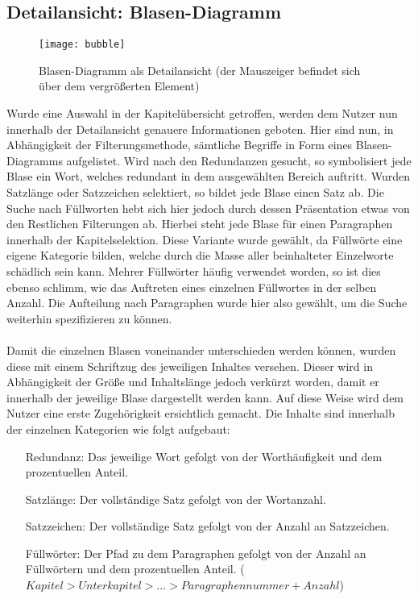 \subsection{Detailansicht: Blasen-Diagramm}\label{subsec:bubble}
\begin{figure}[!htbp]
 \centering
 \texttt{[image: bubble]}
 \caption{Blasen-Diagramm als Detailansicht (der Mauszeiger befindet sich \"uber dem vergr\"o{\ss}erten Element)}
 \label{fig:bubble}
\end{figure}
Wurde eine Auswahl in der Kapitel\"ubersicht getroffen, werden dem Nutzer nun innerhalb der Detailansicht genauere Informationen geboten. Hier sind nun, in Abh\"angigkeit der Filterungsmethode, s\"amtliche Begriffe in Form eines Blasen-Diagramms aufgelistet. Wird nach den Redundanzen gesucht, so symbolisiert jede Blase ein Wort, welches redundant in dem ausgew\"ahlten Bereich auftritt. Wurden Satzl\"ange oder Satzzeichen selektiert, so bildet jede Blase einen Satz ab. Die Suche nach F\"ullworten hebt sich hier jedoch durch dessen Pr\"asentation etwas von den Restlichen Filterungen ab. Hierbei steht jede Blase f\"ur einen Paragraphen innerhalb der Kapitelselektion. Diese Variante wurde gew\"ahlt, da F\"ullw\"orte eine eigene Kategorie bilden, welche durch die Masse aller beinhalteter Einzelworte sch\"adlich sein kann. Mehrer F\"ullw\"orter h\"aufig verwendet worden, so ist dies ebenso schlimm, wie das Auftreten eines einzelnen F\"ullwortes in der selben Anzahl. Die Aufteilung nach Paragraphen wurde hier also gew\"ahlt, um die Suche weiterhin spezifizieren zu k\"onnen.\\
\\
Damit die einzelnen Blasen voneinander unterschieden werden k\"onnen, wurden diese mit einem Schriftzug des jeweiligen Inhaltes versehen. Dieser wird in Abh\"angigkeit der Gr\"o{\ss}e und Inhaltsl\"ange jedoch verk\"urzt worden, damit er innerhalb der jeweilige Blase dargestellt werden kann. Auf diese Weise wird dem Nutzer eine erste Zugeh\"origkeit ersichtlich gemacht. Die Inhalte sind innerhalb der einzelnen Kategorien wie folgt aufgebaut: \\
\begin{center} 
   \begin{varwidth}{2in} 
      \begin{itemize} 
         \item[Redundanz:] Das jeweilige Wort gefolgt von der Worth\"aufigkeit und dem prozentuellen Anteil. 
		 \item[Satzl\"ange:] Der vollst\"andige Satz gefolgt von der Wortanzahl.
		 \item[Satzzeichen:] Der vollst\"andige Satz gefolgt von der Anzahl an Satzzeichen.
		 \item[F\"ullw\"orter:] Der Pfad zu dem Paragraphen gefolgt von der Anzahl an F\"ullw\"ortern und dem prozentuellen Anteil. (\(Kapitel  >  Unterkapitel  >  . . .  >  Paragraphennummer + Anzahl\))
      \end{itemize} 
   \end{varwidth} 
\end{center}
